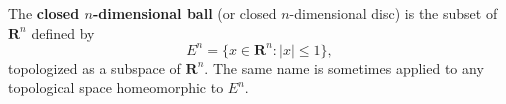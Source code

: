 The \textbf{closed $n$-dimensional ball} (or closed $n$-dimensional disc) is the subset of $\mathbf{R}^n$ defined by
\[
E^n = \{ x \in \mathbf{R}^n : |x| \leq 1 \},
\]
topologized as a subspace of $\mathbf{R}^n$. The same name is sometimes applied to any topological space homeomorphic to $E^n$.
